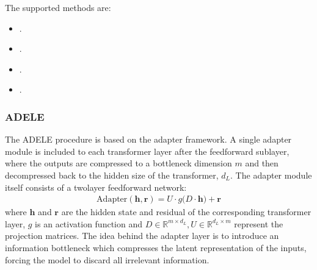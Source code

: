 \documentclass[letterpaper,10pt,english]{sphinxmanual}
\begin{document}
\sphinxAtStartPar
The supported methods are:
\begin{itemize}
\item {} 
\sphinxAtStartPar
{\hyperref[\detokenize{algorithms_inprocessors:adele}]{}} .

\item {} 
\sphinxAtStartPar
{\hyperref[\detokenize{algorithms_inprocessors:ear}]{}} .

\item {} 
\sphinxAtStartPar
{\hyperref[\detokenize{algorithms_inprocessors:embreg}]{}} .

\item {} 
\sphinxAtStartPar
{\hyperref[\detokenize{algorithms_inprocessors:selective}]{}} .

\end{itemize}


\subsubsection{ADELE}
\label{\detokenize{algorithms_inprocessors:adele}}\label{\detokenize{algorithms_inprocessors:id1}}
\sphinxAtStartPar
The ADELE procedure  is based on the adapter framework.
A single adapter module is included to each transformer layer after the feed\sphinxhyphen{}forward sub\sphinxhyphen{}layer, where the outputs are compressed to a bottleneck dimension
\(m\) and then decompressed back to the hidden size of the transformer, \(d_L\). The adapter module itself consists of a two\sphinxhyphen{}layer feed\sphinxhyphen{}forward network:
\begin{equation*}
\begin{split}\text{Adapter}(\mathbf{h}, \mathbf{r}) = U \cdot g(D\cdot \mathbf{h) + \mathbf{r}}\end{split}
\end{equation*}
\sphinxAtStartPar
where \(\mathbf{h}\) and \(\mathbf{r}\) are the hidden state and residual of the corresponding transformer layer, \(g\) is an activation function and
\(D \in \mathbb{R}^{m \times d_L}, U \in \mathbb{R}^{d_L\times m}\) represent the projection matrices.
The idea behind the adapter layer is to introduce an information bottleneck which compresses the latent representation of the inputs,
forcing the model to discard all irrelevant information.
\end{document}
